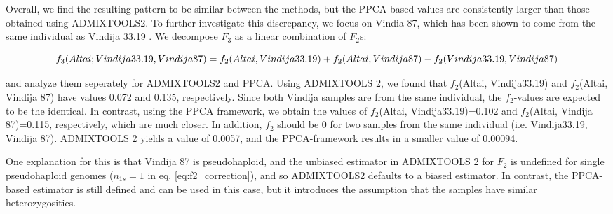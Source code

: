 \documentclass[12pt]{article}
\begin{document}
Overall, we find the resulting pattern to be similar between the methods, but the PPCA-based values are consistently larger than those obtained using ADMIXTOOLS2. To further investigate this discrepancy, we focus on Vindia 87, which has been shown to come from the same individual as Vindija 33.19 \citep{hajdinjak_reconstructing_2018}. We decompose  $F_3$ as a linear combination of $F_2$s:

\begin{dmath}
    f_3(Altai; Vindija33.19, Vindija 87) = f_2(Altai, Vindija33.19) + f_2(Altai, Vindija 87) - f_2(Vindija33.19, Vindija 87)\\
\end{dmath}

and analyze them seperately for ADMIXTOOLS2 and PPCA.
Using ADMIXTOOLS 2, we found that $f_2$(Altai, Vindija33.19) and $f_2$(Altai, Vindija 87) have values 0.072 and 0.135,  respectively. Since both Vindija samples are from the same individual, the $f_2$-values are expected to be the identical. In contrast, using the PPCA framework, we obtain the values of $f_2$(Altai, Vindija33.19)=0.102 and $f_2$(Altai, Vindija 87)=0.115, respectively, which are much closer. In addition, $f_2$ should be 0 for two samples from the same individual (i.e. Vindija33.19, Vindija 87). ADMIXTOOLS 2 yields a value of 0.0057, and the PPCA-framework results in a smaller value of 0.00094. 

One explanation for this is that Vindija 87 is pseudohaploid, and the unbiased estimator in ADMIXTOOLS 2 for $F_2$ is undefined for single pseudohaploid genomes ($n_{1s}=1$ in eq. \ref{eq:f2_correction}), and so ADMIXTOOLS2 defaults to a biased estimator. In contrast, the PPCA-based estimator is still defined and can be used in this case, but it introduces the assumption that the samples have similar heterozygosities. 
\end{document}
